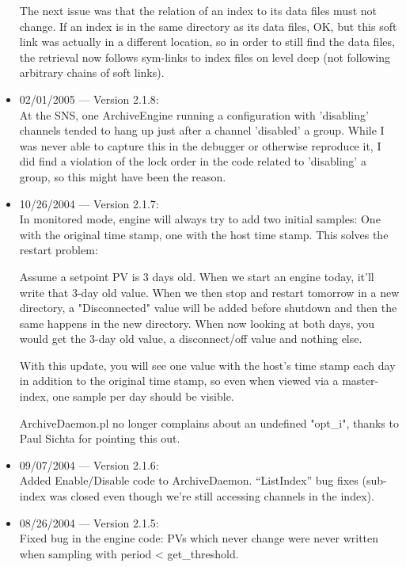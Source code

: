 \begin{itemize}
The next issue was that the relation of an index
to its data files must not change.
If an index is in the same directory as its data files,
OK, but this soft link was actually in a different location,
so in order to still find the data files, the retrieval
now follows sym-links to index files on level deep
(not following arbitrary chains of soft links).

\item 02/01/2005 --- Version 2.1.8:\\
At the SNS, one ArchiveEngine running a configuration with
'disabling' channels tended to hang up just after a channel
'disabled' a group.
While I was never able to capture this in the debugger or
otherwise reproduce it, I did find a violation of the lock
order in the code related to 'disabling' a group, so this
might have been the reason.

\item 10/26/2004 --- Version 2.1.7:\\
In monitored mode, engine will always try to add two initial
samples: One with the original time stamp, one with the host
time stamp. This solves the restart problem:

Assume a setpoint PV is 3 days old. When we start an engine today,
it'll write that 3-day old value. When we then stop and restart tomorrow
in a new directory, a "Disconnected" value will be added before shutdown
and then the same happens in the new directory.
When now looking at both days, you would get the 3-day old value,
a disconnect/off value and nothing else.

With this update, you will see one value with the host's time stamp
each day in addition to the original time stamp, so even when viewed
via a master-index, one sample per day should be visible.

ArchiveDaemon.pl no longer complains about an undefined "opt\_i",
thanks to Paul Sichta for pointing this out.

\item 09/07/2004 --- Version 2.1.6:\\
Added Enable/Disable code to ArchiveDaemon.
``ListIndex'' bug fixes (sub-index was
closed even though we're still accessing channels in the index).

\item 08/26/2004 --- Version 2.1.5:\\
Fixed bug in the engine code: PVs which never change
were never written when sampling with period < get\_threshold.


\end{itemize}
